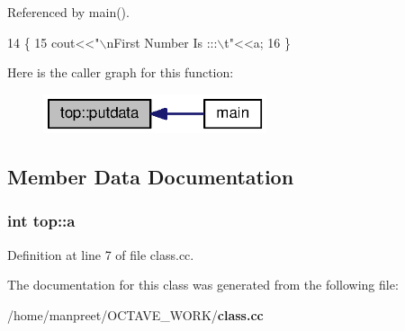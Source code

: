 Referenced by main().


\begin{DoxyCode}
14 \{
15 cout<<\textcolor{stringliteral}{"\(\backslash\)nFirst Number Is :::\(\backslash\)t"}<<a;
16 \}
\end{DoxyCode}


Here is the caller graph for this function\-:\nopagebreak
\begin{figure}[H]
\begin{center}
\leavevmode
\includegraphics[width=186pt]{classtop_a422bc856443aa1975c74122d6ed59b70_icgraph}
\end{center}
\end{figure}




\subsection{Member Data Documentation}
\subsubsection[{a}]{\setlength{\rightskip}{0pt plus 5cm}int top\-::a}\label{classtop_a872b030cc6806bd91642f26dd3cd6050}


Definition at line 7 of file class.\-cc.



The documentation for this class was generated from the following file\-:\begin{DoxyCompactItemize}
\item 
/home/manpreet/\-O\-C\-T\-A\-V\-E\-\_\-\-W\-O\-R\-K/{\bf class.\-cc}\end{DoxyCompactItemize}
